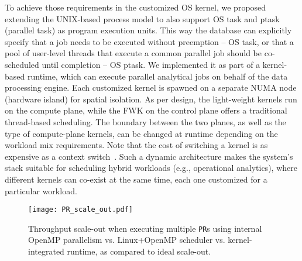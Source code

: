 \documentclass[11pt]{article}
\begin{document}
To achieve those requirements in the customized OS kernel, we proposed extending 
the UNIX-based process model to also support OS task and ptask (parallel task) 
as program execution units. This way the database can explicitly specify that a 
job needs to be executed without preemption -- OS task, or that a pool of 
user-level threads that execute a common parallel job should be co-scheduled 
until completion -- OS ptask. 
We implemented it as part of a kernel-based runtime, which can execute 
parallel analytical jobs on behalf of the data processing engine. Each customized
kernel is spawned on a separate NUMA node (hardware island) for spatial isolation.
As per design, the light-weight kernels run on the compute plane, while the
FWK on the control plane offers a traditional thread-based scheduling. The boundary 
between the two planes, as well as the type of compute-plane kernels, can be changed 
at runtime depending on the workload mix requirements. Note that the cost of switching a
kernel is as expensive as a context switch~\cite{zellweger:osdi14}. 
Such a dynamic architecture makes the system's stack suitable for scheduling 
hybrid workloads (e.g., operational analytics), where different kernels can 
co-exist at the same time, each one customized for a particular workload.

\begin{figure}[t]
\centering
\texttt{[image: PR\_scale\_out.pdf]}
\caption[Comparing throughput scale-out using OpenMP vs. 
Linux+OpenMP vs. Runtime]
{Throughput scale-out when executing multiple \texttt{PR}s using internal OpenMP parallelism vs. Linux+OpenMP scheduler vs. kernel-integrated runtime, as compared to ideal scale-out.}
\label{fig:basslet_results}
\end{figure}
\end{document}
